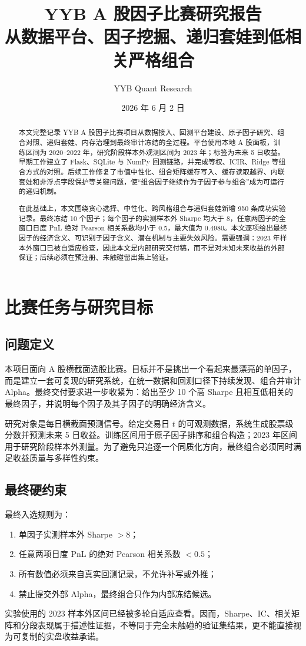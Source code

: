 \documentclass[10pt,a4paper]{article}
\title{YYB A 股因子比赛研究报告\\
\large 从数据平台、因子挖掘、递归套娃到低相关严格组合}
\author{YYB Quant Research}
\date{2026 年 6 月 2 日}
\begin{document}
\maketitle

\begin{abstract}
本文完整记录 YYB A 股因子比赛项目从数据接入、回测平台建设、原子因子研究、组合对照、递归套娃、内存治理到最终审计冻结的全过程。平台使用本地 A 股面板，训练区间为 2020--2022 年，研究阶段样本外观测区间为 2023 年；标签为未来 5 日收益。早期工作建立了 Flask、SQLite 与 NumPy 回测链路，并完成等权、ICIR、Ridge 等组合方式的对照。后续工作修复了市值中性化、组合矩阵缓存写入、缓存读取越界、内联套娃和非浮点字段保护等关键问题，使“组合因子继续作为子因子参与组合”成为可运行的递归机制。

在此基础上，本文围绕贪心选择、中性化、跨风格组合与递归套娃新增 950 条成功实验记录。最终冻结 10 个因子；每个因子的实测样本外 Sharpe 均大于 8，任意两因子的全窗口日度 PnL 绝对 Pearson 相关系数均小于 0.5，最大值为 0.4980。本文逐项给出最终因子的经济含义、可识别子因子含义、潜在机制与主要失效风险。需要强调：2023 年样本外窗口已被自适应检查，因此本文是内部研究交付稿，而不是对未知未来收益的外部保证；后续必须在预注册、未触碰留出集上验证。
\end{abstract}

\section{比赛任务与研究目标}
\subsection{问题定义}
本项目面向 A 股横截面选股比赛。目标并不是挑出一个看起来最漂亮的单因子，而是建立一套可复现的研究系统，在统一数据和回测口径下持续发现、组合并审计 Alpha。最终交付要求进一步收紧为：给出至少 10 个高 Sharpe 且相互低相关的最终因子，并说明每个因子及其子因子的明确经济含义。

研究对象是每日横截面预测信号。给定交易日 $t$ 的可观测数据，系统生成股票级分数并预测未来 5 日收益。训练区间用于原子因子排序和组合构造；2023 年区间用于研究阶段样本外测量。为了避免只追逐一个同质化方向，最终组合必须同时满足收益质量与多样性约束。

\subsection{最终硬约束}
最终入选规则为：
\begin{enumerate}
  \item 单因子实测样本外 Sharpe $>8$；
  \item 任意两项日度 PnL 的绝对 Pearson 相关系数 $<0.5$；
  \item 所有数值必须来自真实回测记录，不允许补写或外推；
  \item 禁止提交外部 Alpha，最终组合只作为内部冻结候选。
\end{enumerate}
实验使用的 2023 样本外区间已经被多轮自适应查看。因而，Sharpe、IC、相关矩阵和分段表现属于描述性证据，不等同于完全未触碰的验证集结果，更不能直接视为可复制的实盘收益承诺。
\end{document}
